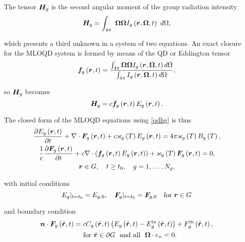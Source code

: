 	The tensor $\bm{H}_g$ is the second angular moment of the group radiation intensity
	\begin{equation}
		\bm{H}_g = \int_{4\pi} \ \bm{\Omega}\bm{\Omega}I_{g}\left(\bm{r},\bm{\Omega},t\right) \ d\Omega,
	\end{equation}
	
	which presents a third unknown in a system of two equations. An exact closure for the MLOQD system is formed by means of the QD or Eddington tensor \cite{gol'din-1964}
	\begin{align}
		\bm{f}_g\left(\bm{r},t\right) = \frac{ \int_{4\pi} \bm{\Omega}\bm{\Omega}I_{g}\left(\bm{r},\bm{\Omega},t\right) d\Omega }{ \int_{4\pi} I_{g}\left(\bm{r},\bm{\Omega},t\right) d\Omega }, \label{qd_tensor}
	\end{align}
	
	
	so $\bm{H}_g$ becomes
	\begin{equation}
		\bm{H}_g = c\bm{f}_g\left(\bm{r},t\right)E_g\left(\bm{r},t\right). \label{qdhg}
	\end{equation} 
	
	The closed form of the MLOQD equations using \eqref{qdhg} is thus
	\begin{subequations}
		\begin{gather}
			\frac{\partial E_g\left(\bm{r},t\right)}{\partial t} + \nabla\cdot\bm{F}_g\left(\bm{r},t\right) + c\varkappa_{g}\left( T\right)E_g\left(\bm{r},t\right) = 4\pi\varkappa_{g}\left( T\right)B_{g}\left( T\right), \label{mqd_1} \\
			\frac{1}{c}\frac{\partial \bm{F}_g\left(\bm{r},t\right)}{\partial t} + c\nabla\cdot\left(\bm{f}_g\left(\bm{r},t\right)E_g\left(\bm{r},t\right)\right) + \varkappa_{g}\left( T\right)\bm{F}_g\left(\bm{r},t\right) = 0, \label{mqd_2}\\
			\bm{r} \in G, \quad t\geq t_0, \quad g=1,\dots,N_g, \nonumber
		\end{gather}
		\label{mqd_sys}
	\end{subequations}	
	
	with initial conditions
	\begin{equation}
		E_g|_{t=t_0} = E_{g,0}, \quad \bm{F}_g|_{t=t_0} = \bm{F}_{g,0} \quad \text{for } \bm{r} \in G
	\end{equation}
	
	and boundary condition \cite{gol'din-1972}
	\begin{gather}
		\bm{n}\cdot\bm{F}_g\left(\tilde{\bm{r}},t\right) = cC_g\left(\tilde{\bm{r}},t\right)\left(E_g\left(\tilde{\bm{r}},t\right) - E_g^{\text{in}}\left(\tilde{\bm{r}},t\right)\right) + F_g^{\text{in}}\left(\tilde{\bm{r}},t\right),\\ \quad \text{for } \tilde{\bm{r}} \in\partial G \ \text{ and all } \ \bm{\Omega}\cdot e_n < 0.\nonumber
	\end{gather}
	
